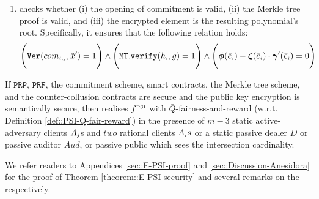 \begin{enumerate}[leftmargin=5mm]
\begin{enumerate}[leftmargin=2.4mm]
 \item\label{e-psi::SC-verification--check-three-vals} checks whether (i) the opening of commitment is valid,  (ii) the Merkle tree proof is valid, and (iii) the encrypted element is the resulting polynomial's root. Specifically, it ensures that the following relation holds: 
$$\Bigg(\mathtt{Ver}(com_{\scriptscriptstyle i,j}, \hat{x}')=1\Bigg)  \wedge  \Bigg(\mathtt{MT.verify}(h_{\scriptscriptstyle i},g)=1\Bigg) \wedge  \Bigg(\bm\phi( \bar{e}_{\scriptscriptstyle i})-\bm\zeta( \bar{e}_{\scriptscriptstyle i})\cdot \bm\gamma'( \bar{e}_{\scriptscriptstyle i})=0\Bigg)$$
%
%
%
\end{enumerate}




\end{enumerate}

\vs
\vs

 \begin{theorem}\label{theorem::E-PSI-security}
If  $\mathtt{PRP}$, $\mathtt{PRF}$, the commitment scheme, smart contracts, the Merkle tree scheme, \fpsi and the counter-collusion contracts are secure and the public key encryption is semantically secure,  then  \epsi realises  $f^{\scriptscriptstyle \text{PSI}}$ with $\bar Q$-fairness-and-reward (w.r.t. Definition \ref{def::PSI-Q-fair-reward}) in the presence of $m-3$ static active-adversary clients $A_{\scriptscriptstyle j}$s and $two$ rational clients $A_{\scriptscriptstyle i}s$ or a static passive dealer $D$ or passive auditor $Aud$, or passive public which sees the intersection cardinality.
 \end{theorem}

\svs
We refer readers to Appendices \ref{sec::E-PSI-proof} and \ref{sec::Discussion-Anesidora} for the proof of Theorem \ref{theorem::E-PSI-security} and several remarks on the \epsi respectively. 
%








